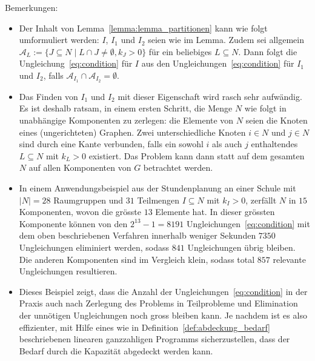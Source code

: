\documentclass{article}
\begin{document}
	Bemerkungen:
	\begin{itemize}
		\item Der Inhalt von Lemma~\ref{lemma:lemma_partitionen} kann wie folgt umformuliert werden: $I$, $I_1$ und $I_2$ seien wie im Lemma. Zudem sei allgemein $\mathcal{A}_L:=\{J\subseteq N \;|\; L\cap J\neq \emptyset, k_J>0\}$ für ein beliebiges $L\subseteq N$. Dann folgt die Ungleichung~\ref{eq:condition} für $I$ aus den Ungleichungen~\ref{eq:condition} für $I_1$ und $I_2$, falls $\mathcal{A}_{I_1}\cap \mathcal{A}_{I_2}=\emptyset$.
		\item Das Finden von $I_1$ und $I_2$ mit dieser Eigenschaft wird rasch sehr aufwändig. Es ist deshalb ratsam, in einem ersten Schritt, die Menge $N$ wie folgt in unabhängige Komponenten zu zerlegen: die Elemente von $N$ seien die Knoten eines (ungerichteten) Graphen. Zwei unterschiedliche Knoten $i\in N$ und $j\in N$ sind durch eine Kante verbunden, falls ein sowohl $i$ als auch $j$ enthaltendes $L\subseteq N$ mit $k_L > 0$ existiert. Das Problem kann dann statt auf dem gesamten $N$ auf allen Komponenten von $G$ betrachtet werden.
		\item In einem Anwendungsbeispiel aus der Stundenplanung an einer Schule mit $|N|=28$ Raumgruppen und $31$ Teilmengen $I\subseteq N$ mit $k_I > 0$, zerfällt $N$ in $15$ Komponenten, wovon die grösste $13$ Elemente hat. In dieser grössten Komponente können von den $2^{13} - 1=8191$ Ungleichungen~\ref{eq:condition} mit dem oben beschriebenen Verfahren innerhalb weniger Sekunden $7350$ Ungleichungen eliminiert werden, sodass $841$ Ungleichungen übrig bleiben. Die anderen Komponenten sind im Vergleich klein, sodass total $857$ relevante Ungleichungen resultieren.
		\item Dieses Beispiel zeigt, dass die Anzahl der Ungleichungen~\ref{eq:condition} in der Praxis auch nach Zerlegung des Problems in Teilprobleme und Elimination der unnötigen Ungleichungen noch gross bleiben kann. Je nachdem ist es also effizienter, mit Hilfe eines  wie in Definition~\ref{def:abdeckung_bedarf} beschriebenen linearen ganzzahligen Programms sicherzustellen, dass der Bedarf durch die Kapazität abgedeckt werden kann.
	\end{itemize}
	
\end{document}
